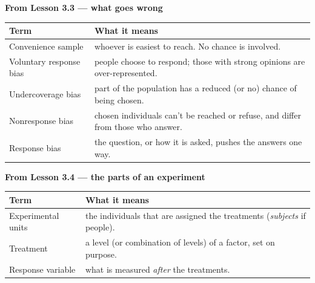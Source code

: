 \documentclass[12pt]{article}
\begin{document}
\vspace{7pt}
\boxguard[9]
\textbf{From Lesson 3.3 --- what goes wrong}
\par\vspace{3pt}
\noindent\begin{tabularx}{\linewidth}{@{} l X @{}}
\rowcolor{sky}
\textbf{Term} & \textbf{What it means} \\
\midrule
Convenience sample & whoever is easiest to reach. No chance is involved. \\
Voluntary response bias & people choose to respond; those with strong opinions are
                   over-represented. \\
Undercoverage bias & part of the population has a reduced (or no) chance of being chosen. \\
Nonresponse bias & chosen individuals can't be reached or refuse, and differ from those who
                   answer. \\
Response bias & the question, or how it is asked, pushes the answers one way. \\
\end{tabularx}

\vspace{7pt}
\boxguard[6]
\textbf{From Lesson 3.4 --- the parts of an experiment}
\par\vspace{3pt}
\noindent\begin{tabularx}{\linewidth}{@{} l X @{}}
\rowcolor{sky}
\textbf{Term} & \textbf{What it means} \\
\midrule
Experimental units & the individuals that are assigned the treatments (\emph{subjects} if people). \\
Treatment & a level (or combination of levels) of a factor, set on purpose. \\
Response variable & what is measured \emph{after} the treatments. \\
\end{tabularx}
\end{document}
